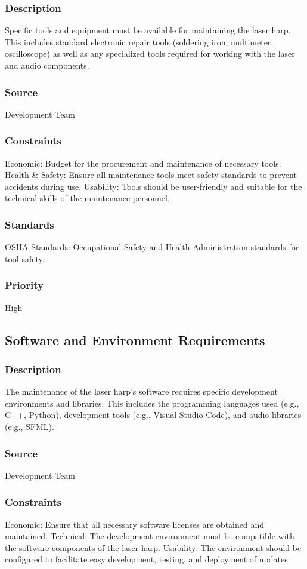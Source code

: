 \subsubsection{Description}
Specific tools and equipment must be available for maintaining the laser harp. This includes standard electronic repair tools (soldering iron, multimeter, oscilloscope) as well as any specialized tools required for working with the laser and audio components.
\subsubsection{Source}
Development Team
\subsubsection{Constraints}
Economic: Budget for the procurement and maintenance of necessary tools.
Health & Safety: Ensure all maintenance tools meet safety standards to prevent accidents during use.
Usability: Tools should be user-friendly and suitable for the technical skills of the maintenance personnel.
\subsubsection{Standards}
OSHA Standards: Occupational Safety and Health Administration standards for tool safety.
\subsubsection{Priority}
High


\subsection{Software and Environment Requirements}
\subsubsection{Description}
The maintenance of the laser harp's software requires specific development environments and libraries. This includes the programming languages used (e.g., C++, Python), development tools (e.g., Visual Studio Code), and audio libraries (e.g., SFML).
\subsubsection{Source}
Development Team
\subsubsection{Constraints}
Economic: Ensure that all necessary software licenses are obtained and maintained.
Technical: The development environment must be compatible with the software components of the laser harp.
Usability: The environment should be configured to facilitate easy development, testing, and deployment of updates.
